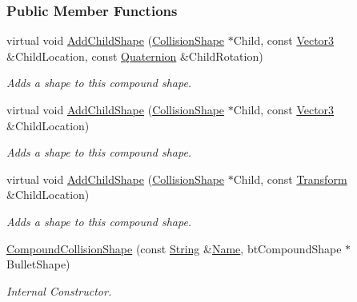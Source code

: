 \subsubsection*{Public Member Functions}
\begin{DoxyCompactItemize}
\item 
virtual void \hyperlink{classMezzanine_1_1CompoundCollisionShape_a84fc66573ca4f052d53474a743305921}{AddChildShape} (\hyperlink{classMezzanine_1_1CollisionShape}{CollisionShape} $\ast$Child, const \hyperlink{classMezzanine_1_1Vector3}{Vector3} \&ChildLocation, const \hyperlink{classMezzanine_1_1Quaternion}{Quaternion} \&ChildRotation)
\begin{DoxyCompactList}\small\item\em Adds a shape to this compound shape. \item\end{DoxyCompactList}\item 
virtual void \hyperlink{classMezzanine_1_1CompoundCollisionShape_af4549334b9423e12eb36b48015956b7d}{AddChildShape} (\hyperlink{classMezzanine_1_1CollisionShape}{CollisionShape} $\ast$Child, const \hyperlink{classMezzanine_1_1Vector3}{Vector3} \&ChildLocation)
\begin{DoxyCompactList}\small\item\em Adds a shape to this compound shape. \item\end{DoxyCompactList}\item 
virtual void \hyperlink{classMezzanine_1_1CompoundCollisionShape_a9f6234a1d1bdcf96c2699df57b0ab7f8}{AddChildShape} (\hyperlink{classMezzanine_1_1CollisionShape}{CollisionShape} $\ast$Child, const \hyperlink{classMezzanine_1_1Transform}{Transform} \&ChildLocation)
\begin{DoxyCompactList}\small\item\em Adds a shape to this compound shape. \item\end{DoxyCompactList}\item 
\hyperlink{classMezzanine_1_1CompoundCollisionShape_a3d31ddbff556b73429acc44ae6aeeef3}{CompoundCollisionShape} (const \hyperlink{namespaceMezzanine_acf9fcc130e6ebf08e3d8491aebcf1c86}{String} \&\hyperlink{classMezzanine_1_1CollisionShape_aac524c5c56fa4d158bc071f8aecfbe79}{Name}, btCompoundShape $\ast$BulletShape)
\begin{DoxyCompactList}\small\item\em Internal Constructor. \item\end{DoxyCompactList}\item 

\end{DoxyCompactItemize}
